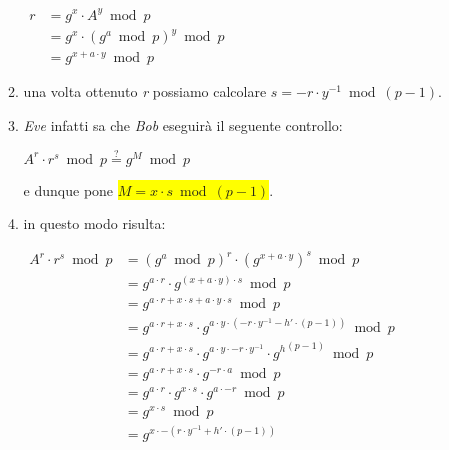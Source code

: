 \begin{itemize}
\begin{enumerate}
        \begin{center}
            \begin{math}
                \begin{aligned}
                    r &= g^x \cdot A^y \bmod p \\
                    &= g^x \cdot (g^a \bmod p)^y \bmod p \\
                    &= g^{x + a \cdot y} \bmod p
                \end{aligned}
            \end{math}
        \end{center}
        \item una volta ottenuto \textit{r} possiamo calcolare $s = -r \cdot y^{-1} \bmod (p - 1)$.
        \item \textit{Eve} infatti sa che \textit{Bob} eseguirà il seguente controllo:
        \begin{center}
            $A^r \cdot r^s \bmod p \stackrel{?}{=} g^M \bmod p$
        \end{center}
        e dunque pone \colorbox{yellow}{$M = x \cdot s \bmod (p - 1)$}.
        \item in questo modo risulta:
        \begin{center}
            \begin{math}
                \begin{aligned}
                    A^r \cdot r^s \bmod p &= (g^a \bmod p)^r \cdot (g^{x + a \cdot y})^s \bmod p \\
                    &= g^{a \cdot r} \cdot g^{(x + a \cdot y) \cdot s} \bmod p \\
                    &= g^{a \cdot r + x \cdot s + a \cdot y \cdot s} \bmod p \\
                    &= g^{a \cdot r + x \cdot s} \cdot g^{a \cdot y \cdot (-r \cdot y^{-1} - h' \cdot (p - 1))} \bmod p \\
                    &= g^{a \cdot r + x \cdot s} \cdot g^{a \cdot y \cdot -r \cdot y^{-1}} \cdot {g^{h}}^{(p - 1)} \bmod p \\
                    &= g^{a \cdot r + x \cdot s} \cdot g^{-r \cdot a} \bmod p \\
                    &= g^{a \cdot r} \cdot g^{x \cdot s} \cdot g^{a \cdot -r} \bmod p \\
                    &= g^{x \cdot s} \bmod p \\
                    &= g^{x \cdot -(r \cdot y^{-1} + h' \cdot (p - 1))} \\

\end{aligned}
\end{math}
\end{center}
\end{enumerate}
\end{itemize}
